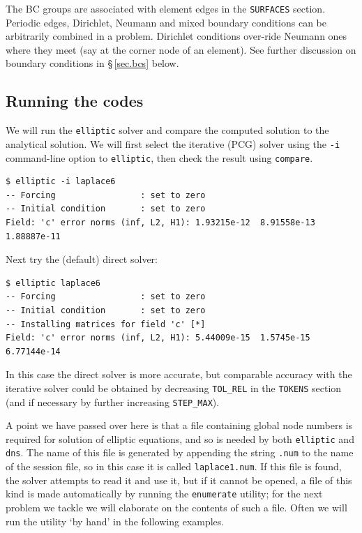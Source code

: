 \documentclass[11pt]{report}
\begin{document}
The BC groups are associated with element edges in the
\texttt{SURFACES} section.  Periodic edges, Dirichlet, Neumann and
mixed boundary conditions can be arbitrarily combined in a problem.
Dirichlet conditions over-ride Neumann ones where they meet (say at
the corner node of an element). See further discussion on boundary
conditions in \S\,\ref{sec.bcs} below.

\subsection{Running the codes}
\label{sec.runell}

We will run the \verb|elliptic| solver and compare the computed
solution to the analytical solution.  We will first select the
iterative (PCG) solver using the \verb+-i+ command-line option to
\texttt{elliptic}, then check the result using \texttt{compare}.
       {\small
\begin{verbatim}
$ elliptic -i laplace6
-- Forcing                 : set to zero
-- Initial condition       : set to zero
Field: 'c' error norms (inf, L2, H1): 1.93215e-12  8.91558e-13  1.88887e-11
\end{verbatim}
}

Next try the (default) direct solver:
{\small
\begin{verbatim}
$ elliptic laplace6
-- Forcing                 : set to zero
-- Initial condition       : set to zero
-- Installing matrices for field 'c' [*]
Field: 'c' error norms (inf, L2, H1): 5.44009e-15  1.5745e-15  6.77144e-14
\end{verbatim}
}
\noindent
In this case the direct solver is more accurate, but comparable
accuracy with the iterative solver could be obtained by decreasing
\verb+TOL_REL+ in the \texttt{TOKENS} section (and if necessary by
further increasing \verb+STEP_MAX+).

A point we have passed over here is that a file containing global node
numbers is required for solution of elliptic equations, and so is
needed by both \verb|elliptic| and \verb|dns|.  The name of this file
is generated by appending the string \verb|.num| to the name of the
session file, so in this case it is called \verb|laplace1.num|.  If
this file is found, the solver attempts to read it and use it, but if
it cannot be opened, a file of this kind is made automatically by
running the \verb|enumerate| utility; for the next problem we tackle
we will elaborate on the contents of such a file.  Often we will run
the utility `by hand' in the following examples.
\end{document}
